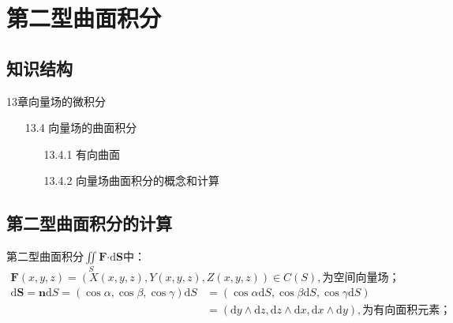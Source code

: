 \documentclass[12pt,UTF8,fleqn]{ctexart}
\newcommand{\md}[1]{\mathrm d#1}
\newcommand{\BSIInt}[2]{\iint\limits_{#1}#2}
\begin{document}
\setcounter{section}{22}
\section{第二型曲面积分}
\subsection{知识结构}
13章向量场的微积分
	\begin{enumerate}
		\item[13.4]向量场的曲面积分
			\begin{enumerate}
				\item[13.4.1]有向曲面
				\item[13.4.2]向量场曲面积分的概念和计算
			\end{enumerate}
	\end{enumerate}
\subsection{第二型曲面积分的计算}
第二型曲面积分$\BSIInt S{\bm F\bm\cdot\md\bm S}$中：
\setlength{\mathindent}{1cm}
\[\bm F(x,y,z)=(X(x,y,z),Y(x,y,z),Z(x,y,z))\in C(S),\text{为空间向量场；}\]
\[\begin{aligned}
\md\bm S=\bm n\md S=(\cos\alpha,\cos\beta,\cos\gamma)\md S&=(\cos\alpha\md S,\cos\beta\md S,\cos\gamma\md S)\\&=(\md y\wedge\md z,\md z\wedge\md x,\md x\wedge\md y),\text{为有向面积元素；}
\end{aligned}\]
\end{document}
